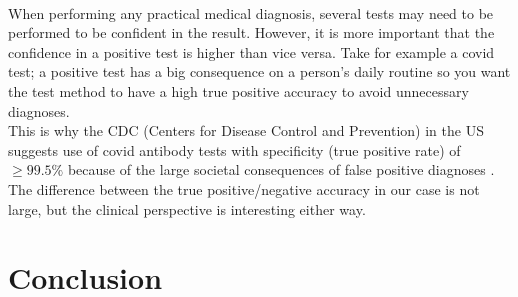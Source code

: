 \documentclass[reprint,english,notitlepage]{revtex4-1}  %
\begin{document}
\vspace{3mm}
\\
When performing any practical medical diagnosis, several tests may need to be performed to be confident in the result. However, it is more important that the confidence in a positive test is higher than vice versa. Take for example a covid test; a positive test has a big consequence on a person's daily routine so you want the test method to have a high true positive accuracy to avoid unnecessary diagnoses. 
\vspace{3mm}
\\
This is why the CDC (Centers for Disease Control and Prevention) in the US suggests use of covid antibody tests with specificity (true positive rate) of $\geq 99.5\%$ because of the large societal consequences of false positive diagnoses \cite{cov}.
\vspace{3mm}
\\
The difference between the true positive/negative accuracy in our case is not large, but the clinical perspective is interesting either way.

\section{Conclusion}\label{sec: conclusion}
\end{document}
